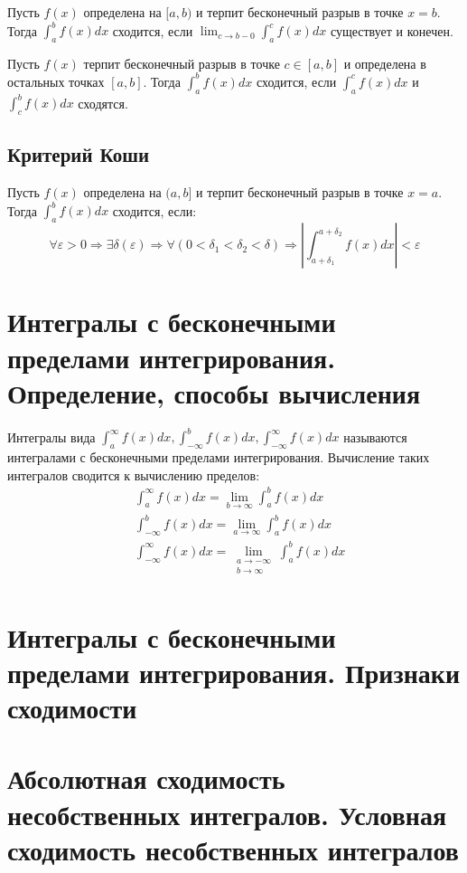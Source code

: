 \documentclass[12pt]{article}
\begin{document}
Пусть $f(x)$ определена на $[a, b)$ и терпит бесконечный разрыв в точке $x = b$. Тогда $\displaystyle \int_{a}^{b} f(x)dx$ сходится, если $\displaystyle \lim_{c \rightarrow b - 0} \int_{a}^{c} f(x)dx$ существует и конечен.

                Пусть $f(x)$ терпит бесконечный разрыв в точке $c \in [a, b]$ и определена в остальных точках $[a, b]$. Тогда $\displaystyle \int_{a}^{b} f(x)dx$ сходится, если $\displaystyle \int_{a}^{c} f(x)dx$ и $\displaystyle \int_c^b f(x)dx$ сходятся.

                \subsection{Критерий Коши}
                Пусть $f(x)$ определена на $(a, b]$ и терпит бесконечный разрыв в точке $x = a$. Тогда $\int_a^b f(x)dx$ сходится, если:
\[
    \forall \varepsilon > 0 \Rightarrow \exists \delta(\varepsilon) \Rightarrow \forall(0 < \delta_1 < \delta_2 < \delta) \Rightarrow \left|\int_{a + \delta_1}^{a + \delta_2}f(x)dx\right| < \varepsilon
\]

\section{Интегралы с бесконечными пределами интегрирования. Определение, способы вычисления}
Интегралы вида $\displaystyle \int_a^{\infty}f(x)dx, \int_{-\infty}^bf(x)dx, \int_{-\infty}^\infty f(x)dx$ называются интегралами с бесконечными пределами интегрирования. Вычисление таких интегралов сводится к вычислению пределов:
\begin{align*}
     & \int_a^{\infty}f(x)dx = \lim_{b \rightarrow \infty} \int_a^bf(x)dx   \\
     & \int_{-\infty}^bf(x)dx = \lim_{a \rightarrow \infty} \int_a^bf(x)dx  \\
     & \int_{-\infty}^{\infty}f(x)dx = \lim_{\substack{a\rightarrow -\infty \\ b \rightarrow \infty}} \int_a^bf(x)dx  \\
\end{align*}

\section{Интегралы с бесконечными пределами интегрирования. Признаки сходимости}

\section{Абсолютная сходимость несобственных интегралов. Условная сходимость несобственных интегралов}
\end{document}
